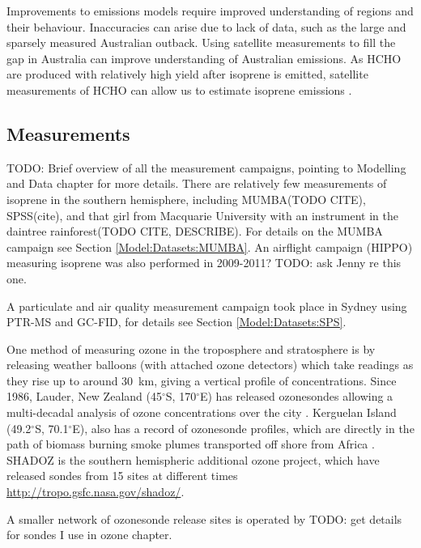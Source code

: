     
    Improvements to emissions models require improved understanding of regions and their behaviour.
    Inaccuracies can arise due to lack of data, such as the large and sparsely measured Australian outback.
    Using satellite measurements to fill the gap in Australia can improve understanding of Australian emissions.
    As HCHO are produced with relatively high yield after isoprene is emitted, satellite measurements of HCHO can allow us to estimate isoprene emissions \parencite[e.g.]{Palmer2001, Millet2006, Bauwens2016}.
    
  
  \subsection{Measurements}
    
    TODO: Brief overview of all the measurement campaigns, pointing to Modelling and Data chapter for more details.
    There are relatively few measurements of isoprene in the southern hemisphere, including MUMBA(TODO CITE), SPSS(cite), and that girl from Macquarie University with an instrument in the daintree rainforest(TODO CITE, DESCRIBE).
    For details on the MUMBA campaign see Section \ref{Model:Datasets:MUMBA}.
    An airflight campaign (HIPPO) measuring isoprene was also performed in 2009-2011? TODO: ask Jenny re this one.
    
    A particulate and air quality measurement campaign took place in Sydney using PTR-MS and GC-FID, for details see Section \ref{Model:Datasets:SPS}.
    
    One method of measuring ozone in the troposphere and stratosphere is by releasing weather balloons (with attached ozone detectors) which take readings as they rise up to around 30~km, giving a vertical profile of concentrations.
    Since 1986, Lauder, New Zealand (45$^{\circ}$S, 170$^{\circ}$E) has released ozonesondes allowing a multi-decadal analysis of ozone concentrations over the city \parencite{Brinksma2002}.
    Kerguelan Island (49.2$^{\circ}$S, 70.1$^{\circ}$E), also has a record of ozonesonde profiles, which are directly in the path of biomass burning smoke plumes transported off shore from Africa \parencite{Baray2012}.
    SHADOZ is the southern hemispheric additional ozone project, which have released sondes from 15 sites at different times \url{http://tropo.gsfc.nasa.gov/shadoz/}.
    
    A smaller network of ozonesonde release sites is operated by TODO: get details for sondes I use in ozone chapter.
  
